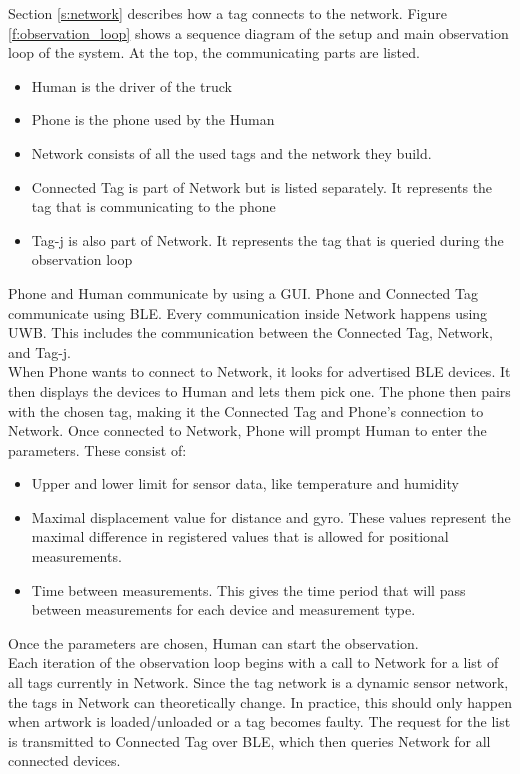 Section \ref{s:network} describes how a tag connects to the network.
Figure \ref{f:observation_loop} shows a sequence diagram of the setup and main observation loop of the system.
At the top, the communicating parts are listed.
\begin{itemize}
	\item Human is the driver of the truck
	\item Phone is the phone used by the Human
	\item Network consists of all the used tags and the network they build.
	\item Connected Tag is part of Network but is listed separately. It represents the tag that is communicating to the phone
	\item Tag-j is also part of Network. It represents the tag that is queried during the observation loop
\end{itemize}
Phone and Human communicate by using a GUI. 
Phone and Connected Tag communicate using BLE. 
Every communication inside Network happens using UWB. This includes the communication between the Connected Tag, Network, and Tag-j. \\
When Phone wants to connect to Network, it looks for advertised BLE devices.
It then displays the devices to Human and lets them pick one.
The phone then pairs with the chosen tag, making it the Connected Tag and Phone's connection to Network.
Once connected to Network, Phone will prompt Human to enter the parameters.
These consist of:
\begin{itemize}
	\item Upper and lower limit for sensor data, like temperature and humidity
	\item Maximal displacement value for distance and gyro. These values represent the maximal difference in registered values that is allowed for positional measurements.
	\item Time between measurements. This gives the time period that will pass between measurements for each device and measurement type.
\end{itemize}
Once the parameters are chosen, Human can start the observation.\\
Each iteration of the observation loop begins with a call to Network for a list of all tags currently in Network.
Since the tag network is a dynamic sensor network, the tags in Network can theoretically change. 
In practice, this should only happen when artwork is loaded/unloaded or a tag becomes faulty.
The request for the list is transmitted to Connected Tag over BLE, which then queries Network for all connected devices.
